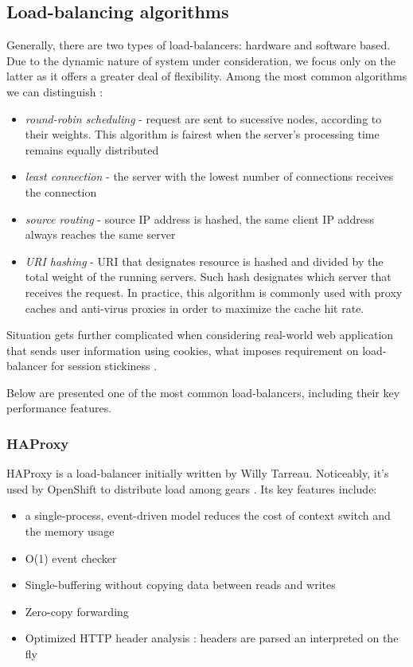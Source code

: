 \subsection{Load-balancing algorithms}
Generally, there are two types of load-balancers: hardware and software based. Due to the dynamic nature of system under consideration, we focus only on the latter as it offers a greater deal of flexibility. Among the most common algorithms we can distinguish \cite{HaProxyDoc}:
\begin{itemize}
 \item \textit{round-robin scheduling} - request are sent to sucessive nodes, according to their weights. This algorithm is fairest when the server's processing time remains equally distributed \cite{HaProxyDoc}
 \item \textit{least connection} - the server with the lowest number of connections receives the connection
 \item \textit{source routing} - source IP address is hashed, the same client IP address always reaches the same server
 \item \textit{URI hashing} - URI that designates resource is hashed and divided by the total weight of the running servers. Such hash designates which server that receives the request. In practice, this algorithm is commonly used with proxy caches and anti-virus proxies in order to maximize the cache hit rate.
\end{itemize}

Situation gets further complicated when considering real-world web application that sends user information using cookies, what imposes requirement on load-balancer for session stickiness \cite{StBaMa11}. 

Below are presented one of the most common load-balancers, including their key performance features.

\subsubsection*{HAProxy}

HAProxy \cite{HAProxy} is a load-balancer initially written by Willy Tarreau. Noticeably, it's used by OpenShift \cite{OpenShift} to distribute load among gears \cite{OpenShiftScaling}. Its key features include:
\begin{itemize}
	\item a single-process, event-driven model reduces the cost of context switch and the memory usage
	\item O(1) event checker
	\item Single-buffering without copying data between reads and writes
	\item Zero-copy forwarding
	\item Optimized HTTP header analysis : headers are parsed an interpreted on the fly
\end{itemize}


